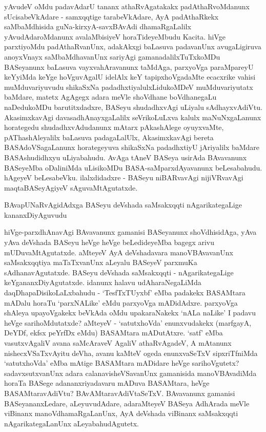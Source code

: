 yAvudeV oMdu padavAdarU tananx athaRvAgatakakx padAthaRvoMdanunx sUcisabeVkAdare - samxqqtige tarabeVkAdare, AyA padAthaRkekx saMbaMdhisida guNa-kirxyA-savxBAvAdi dhamaRgaLalilx yAvudAdaroMdanunx avalaMbisiyeV horaTideyeMbudu Kacita. hiVge parxtiyoMdu padAthaRvanUnx, adakAkxgi baLasuva padavanUnx avugaLigiruva anoyxVnayx saMbaMdhavanUnx sariyAgi gamanadalilxTuTxkoMDu BASeyanunx baLasuva vayxvahAravanunx taMdAga, parxyoVga paraMpareyU keYyiMda keYge hoVguvAgalU idelAlx keY tapipxhoVgadaMte ecacxrike vahisi muMduvariyuvudu shikaSxNa padadhxtiyalulxLidukoMDeV muMduvariyutatx baMdare, matetx AgAgegx adara meVle shoVdhane boVdhanegaLu naDedukoMDu barutitxdadxre, BASeyu shudadhxvAgi uLiyalu sAdhayxvAdiVtu. AkasimxkavAgi davasadhAnayxgaLalilx seVrikoLuLxva kalulx maNuNxgaLanunx horategedu shudadhxvAdudanunx mAtarx pAkashAlege oyuyxvaMte, pAThashAleyalilx baLasuva padagaLalUlx, AkasimxkavAgi bereta BASAdoVSagaLanunx horategeyuva shikaSxNa padadhxtiyU jAriyalilx baMdare BASAshudidhxyu uLiyabahudu. AvAga tAneV BASeya usirAda BAvavanunx BASeyeMba oDaliniMda uLisikoMDu BASA-saMparxdAyavanunx beLesabahudu. hAgeyeV beLesabeVku. ilalxdidadxre - BASeyu niBARvavAgi nijiVRvavAgi maqtaBASeyAgiyeV sAguvaMtAgutatxde.

BAvapUNaRvAgidAdxga BASeyu deVshada saMsakxqqti nAgarikategaLige kananxDiyAguvudu

hiVge-parxdhAnavAgi BAvavanunx gamanisi BASeyanunx shoVdhisidAga, yAva yAva deVshada BASeyu heVge heVge beLedideyeMba bagegx arivu mUDuvaMtAgutatxde. aMteyeV AyA deVshadavara manoVBAvavanUnx saMsakxqqtiya maTaTxvanUnx aLeyalu BASeyeV parxmuKa sAdhanavAgutatxde. BASeyu deVshada saMsakxqqti - nAgarikategaLige keYgananxDiyAgutatxde. idanunx halavu udAharaNegaLiMda daqDhapaDisikoLaLxbahudu - `TesfTxTUyxbf' eMba padakekx BASAMtara mADalu horaTu `parxNALike' eMdu parxyoVga mADidAdxre. parxyoVga shAleya upayoVgakekx beVkAda oMdu upakaraNakekx `nALa naLike' I padavu heVge sarihoMdutatxde? aMteyeV - `satutxhoVda' enunxvudakekx (marfgayA, DeYDf, ekfsx peYrfDx eMdu) BASAMtara mADutAtxre. `satf' eMba vasutxvAgaliV avana saMcAraveV AgaliV athaRvAgadeV, A mAtanunx nishecxVSaTxvAyitu deVha, avanu kaMteV ogeda enunxvaSeTxV sipxriTfniMda `satutxhoVda' eMba mAtige BASAMtara mADidare heVge sarihoVgutetx? sadavxsutxvanUnx adara calanavisheVSavanUnx gamanisida manoVBAvadiMda horaTa BASege adananxriyadavaru mADuva BASAMtara, heVge BASAMtaravAdiVtu? BAvAMtaravAdiVtaSeTxV. BAvavanunx gamanisi BASeyananxLedare, aLeyuvudAdare, adaraMteyeV BASeya AdhArada meVle viBinanx manoVdhamaRgaLanUnx, AyA deVshada viBinanx saMsakxqqti nAgarikategaLanUnx aLeyabahudAgutetx.

